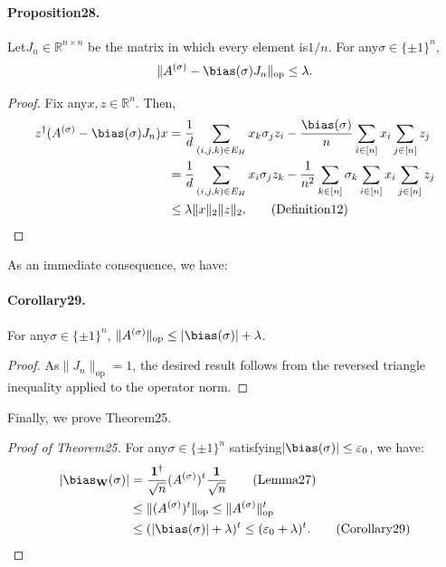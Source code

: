\paragraph{Proposition28.} Let$J_n\in\mathbb R^{n\times n}$ be the matrix in which every element is$1/n$. For any$\sigma\in\{\pm1\}^n$,
\[\|A^{(\sigma)}-\bias(\sigma)J_n\|_{\mathrm{op}}\leq\lambda.\]
\begin{proof}
Fix any$x,z\in\mathbb R^n$. Then,
\begin{align*}
z^{\dagger}(A^{(\sigma)}-\bias(\sigma)J_n)x&=\frac1d\sum_{(i,j,k)\in E_H}x_k\sigma_jz_i-\frac{\bias(\sigma)}n\sum_{i\in[n]}x_i\sum_{j\in[n]}z_j\\
&=\frac1d\sum_{(i,j,k)\in E_H}x_i\sigma_jz_k-\frac1{n^2}\sum_{k\in[n]}\sigma_k\sum_{i\in[n]}x_i\sum_{j\in[n]}z_j\\
&\leq\lambda\|x\|_2\|z\|_2.\qquad\text{(Definition12)}
\end{align*}
\end{proof}
As an immediate consequence, we have:
\paragraph{Corollary29.} For any$\sigma\in\{\pm1\}^n$, $\|A^{(\sigma)}\|_{\mathrm{op}}\leq|\bias(\sigma)|+\lambda$.
\begin{proof}
As$\|J_n\|_{\mathrm{op}}=1$, the desired result follows from the reversed triangle inequality applied to the operator norm.
\end{proof}
Finally, we prove Theorem25.
\begin{proof}[Proof of Theorem25]
For any$\sigma\in\{\pm1\}^n$ satisfying$|\bias(\sigma)|\leq\varepsilon_0$, we have:
\begin{align*}
|\bias_{\mathbf W}(\sigma)|&=\frac{\mathbf1^{\dagger}}{\sqrt n}(A^{(\sigma)})^t\frac{\mathbf1}{\sqrt n}\qquad\text{(Lemma27)}\\
&\leq\|(A^{(\sigma)})^t\|_{\mathrm{op}}\leq\|A^{(\sigma)}\|_{\mathrm{op}}^t\\
&\leq(|\bias(\sigma)|+\lambda)^t\leq(\varepsilon_0+\lambda)^t.\qquad\text{(Corollary29)}
\end{align*}
\end{proof}
